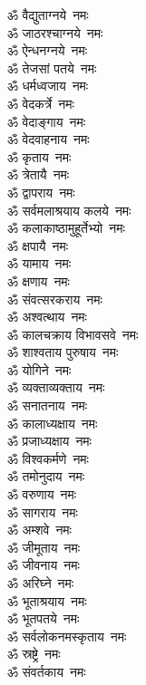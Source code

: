\begin{multicols}{2}
\begin{flushleft}
        ॐ वैद्युताग्नये~नमः\\
        ॐ जाठरश्चाग्नये~नमः\\
        ॐ ऐन्धनग्नये~नमः\hfill{}\\
        ॐ तेजसां पतये~नमः\\
        ॐ धर्मध्वजाय~नमः\\
        ॐ वेदकर्त्रे~नमः\\
        ॐ वेदाङ्गाय~नमः\\
        ॐ वेदवाहनाय~नमः\\
        ॐ कृताय~नमः\\
        ॐ त्रेतायै~नमः\\
        ॐ द्वापराय~नमः\\
        ॐ सर्वमलाश्रयाय कलये~नमः\\
        ॐ कलाकाष्ठामुहूर्तेभ्यो~नमः\hfill{}\\
        ॐ क्षपायै~नमः\\
        ॐ यामाय~नमः\\
        ॐ क्षणाय~नमः\\
        ॐ संवत्सरकराय~नमः\\
        ॐ अश्वत्थाय~नमः\\
        ॐ कालचक्राय विभावसवे~नमः\\
        ॐ शाश्वताय पुरुषाय~नमः\\
        ॐ योगिने~नमः\\
        ॐ व्यक्ताव्यक्ताय~नमः\\
        ॐ सनातनाय~नमः\hfill{}\\
        ॐ कालाध्यक्षाय~नमः\\
        ॐ प्रजाध्यक्षाय~नमः\\
        ॐ विश्वकर्मणे~नमः\\
        ॐ तमोनुदाय~नमः\\
        ॐ वरुणाय~नमः\\
        ॐ सागराय~नमः\\
        ॐ अम्शवे~नमः\\
        ॐ जीमूताय~नमः\\
        ॐ जीवनाय~नमः\\
        ॐ अरिघ्ने~नमः\hfill{}\\
        ॐ भूताश्रयाय~नमः\\
        ॐ भूतपतये~नमः\\
        ॐ सर्वलोकनमस्कृताय~नमः\\
        ॐ स्रष्ट्रे~नमः\\
        ॐ संवर्तकाय~नमः\\

\end{flushleft}
\end{multicols}
